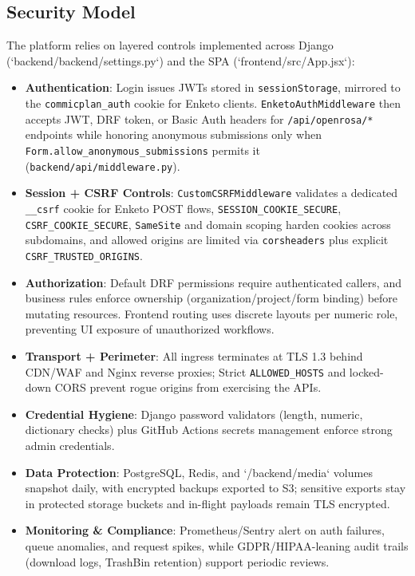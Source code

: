 \documentclass[11pt]{article}
\begin{document}
\subsection{Security Model}
\noindent The platform relies on layered controls implemented across Django (`backend/backend/settings.py`) and the SPA (`frontend/src/App.jsx`):
\begin{itemize}[leftmargin=*]
  \item \textbf{Authentication}: Login issues JWTs stored in \texttt{sessionStorage}, mirrored to the \texttt{commicplan\_auth} cookie for Enketo clients. \texttt{EnketoAuthMiddleware} then accepts JWT, DRF token, or Basic Auth headers for \texttt{/api/openrosa/*} endpoints while honoring anonymous submissions only when \texttt{Form.allow\_anonymous\_submissions} permits it (\texttt{backend/api/middleware.py}).
  \item \textbf{Session + CSRF Controls}: \texttt{CustomCSRFMiddleware} validates a dedicated \texttt{\_\_csrf} cookie for Enketo POST flows, \texttt{SESSION\_COOKIE\_SECURE}, \texttt{CSRF\_COOKIE\_SECURE}, \texttt{SameSite} and domain scoping harden cookies across subdomains, and allowed origins are limited via \texttt{corsheaders} plus explicit \texttt{CSRF\_TRUSTED\_ORIGINS}.
  \item \textbf{Authorization}: Default DRF permissions require authenticated callers, and business rules enforce ownership (organization/project/form binding) before mutating resources. Frontend routing uses discrete layouts per numeric role, preventing UI exposure of unauthorized workflows.
  \item \textbf{Transport + Perimeter}: All ingress terminates at TLS 1.3 behind CDN/WAF and Nginx reverse proxies; Strict \texttt{ALLOWED\_HOSTS} and locked-down CORS prevent rogue origins from exercising the APIs.
  \item \textbf{Credential Hygiene}: Django password validators (length, numeric, dictionary checks) plus GitHub Actions secrets management enforce strong admin credentials.
  \item \textbf{Data Protection}: PostgreSQL, Redis, and `/backend/media` volumes snapshot daily, with encrypted backups exported to S3; sensitive exports stay in protected storage buckets and in-flight payloads remain TLS encrypted.
  \item \textbf{Monitoring \& Compliance}: Prometheus/Sentry alert on auth failures, queue anomalies, and request spikes, while GDPR/HIPAA-leaning audit trails (download logs, TrashBin retention) support periodic reviews.
\end{itemize}
\end{document}
